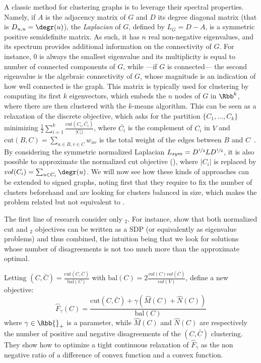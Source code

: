 A classic method for clustering graphs is to leverage their spectral properties. Namely, if $A$ is
the adjacency matrix of $G$ and $D$ its degree diagonal matrix (that is $D_{u,u} = \degr(u)$), the
\emph{Laplacian} of $G$, defined by $L_G = D - A$, is a symmetric positive semidefinite matrix. As
such, it has $n$ real non-negative eigenvalues, and its spectrum provides additional information on
the connectivity of $G$. For instance, $0$ is always the smallest eigenvalue and its multiplicity is
equal to number of connected components of $G$, while ---if $G$ is connected--- the second
eigenvalue is the algebraic connectivity of $G$, whose magnitude is an indication of how well
connected is the graph. This matrix is typically used for clustering by computing its first $k$
eigenvectors, which embeds the $n$ nodes of $G$ in $\Rbb^k$, where there are then clustered with the
$k$-means algorithm. This can be seen as a relaxation of the discrete \rcut{} objective, which asks
for the partition $\{C_1, \ldots, C_k\}$ minimizing $\frac{1}{2}\sum_{i=1}^k \frac{\mathrm{cut}(C_i,
\bar{C_i})}{|C_i|}$, where $\bar{C_i}$ is the complement of $C_i$ in $V$ and $\mathrm{cut}(B, C) =
\sum_{u\in B, v\in C} w_{uv}$ is the total weight of the edges between $B$ and
$C$~\autocite{tutoSpectralClustering07}. By considering the symmetric normalized Laplacian
$L_{sym}  = D^{\nicefrac{1}{2}}LD^{\nicefrac{1}{2}}$, it is also possible to approximate the
normalized cut objective (\ncut{}), where $|C_i|$ is replaced by $vol(C_i) = \sum_{u\in C_i}
\degr(u)$. We will now see how these kinds of approaches can be extended to signed graphs, noting
first that they require to fix the number of clusters beforehand and are looking for clusters
balanced in size, which makes the problem related but not equivalent to \pcc{}.

The first line of research consider only \mind{}$_2$. For instance, \textcite{NcutAnd2CC08} show
that both normalized cut and \mind{}$_2$ objectives can be written as a SDP (or equivalently as
eigenvalue problems) and thus combined, the intuition being that we look for \ncut{} solutions whose
number of disagreements is not too much more than the approximate optimal.

Letting \ncut{}$(C, \bar{C}) = \frac{\mathrm{cut}(C, \bar{C})}{\mathrm{bal}(C)}$ with
$\mathrm{bal}(C) = 2\frac{vol(C)vol(\bar{C})}{vol(V)}$, \textcite{mOneCC12} define a new objective:
\begin{equation*}
  \hat{F}_\gamma(C) = \frac{\mathrm{cut}(C, \bar{C}) + \gamma\left(\hat{M}(C)+\hat{N}(C)\right)}{\mathrm{bal}(C)}
\end{equation*}
where $\gamma \in \Rbb{}_+$ is a parameter, while $\hat{M}(C)$ and $\hat{N}(C)$ are respectively the
number of positive and negative disagreements of the $(C, \bar{C})$ clustering.
They show how to optimize a tight continuous relaxation of $\hat{F}_\gamma$ as the non negative
ratio of a difference of convex function and a convex function.

